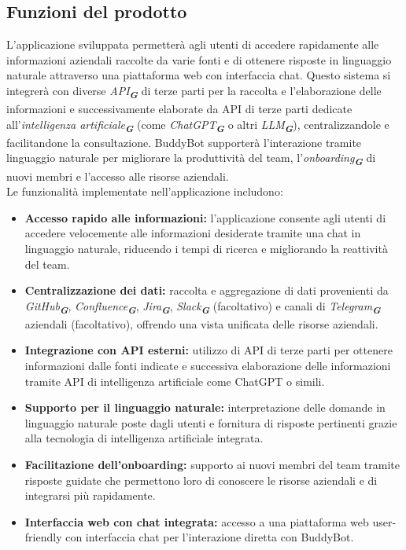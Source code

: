 \subsection{Funzioni del prodotto}
L'applicazione sviluppata permetterà agli utenti di accedere rapidamente alle informazioni aziendali raccolte da varie 
fonti e di ottenere risposte in linguaggio naturale attraverso una piattaforma web con interfaccia chat. Questo sistema 
si integrerà con diverse \emph{API}\textsubscript{\textit{\textbf{G}}}  di terze parti per la raccolta e l'elaborazione delle informazioni e successivamente elaborate
da API  di terze parti dedicate all'\emph{intelligenza artificiale}\textsubscript{\textit{\textbf{G}}}  (come \emph{ChatGPT}\textsubscript{\textit{\textbf{G}}} o altri \emph{LLM}\textsubscript{\textit{\textbf{G}}}), centralizzandole e facilitandone la consultazione. 
BuddyBot supporterà l'interazione tramite linguaggio naturale per migliorare la produttività del team, l'\emph{onboarding}\textsubscript{\textit{\textbf{G}}} di nuovi 
membri e l'accesso alle risorse aziendali.\\
Le funzionalità implementate nell'applicazione includono:
\begin{itemize}
    \item \textbf{Accesso rapido alle informazioni:} l'applicazione consente agli utenti di accedere velocemente alle informazioni desiderate tramite una chat in linguaggio naturale, riducendo i tempi di ricerca e migliorando la reattività del team.
    \item \textbf{Centralizzazione dei dati:} raccolta e aggregazione di dati provenienti da \emph{GitHub}\textsubscript{\textit{\textbf{G}}}, \emph{Confluence}\textsubscript{\textit{\textbf{G}}}, \emph{Jira}\textsubscript{\textit{\textbf{G}}}, \emph{Slack}\textsubscript{\textit{\textbf{G}}} (facoltativo) e canali di \emph{Telegram}\textsubscript{\textit{\textbf{G}}} aziendali (facoltativo), offrendo una vista unificata delle risorse aziendali.
    \item \textbf{Integrazione con API esterni:} utilizzo di API di terze parti per ottenere informazioni dalle fonti indicate e successiva elaborazione delle informazioni tramite API di intelligenza artificiale come ChatGPT o simili.
    \item \textbf{Supporto per il linguaggio naturale:} interpretazione delle domande in linguaggio naturale poste dagli utenti e fornitura di risposte pertinenti grazie alla tecnologia di intelligenza artificiale integrata.
    \item \textbf{Facilitazione dell'onboarding:} supporto ai nuovi membri del team tramite risposte guidate che permettono loro di conoscere le risorse aziendali e di integrarsi più rapidamente.
    \item \textbf{Interfaccia web con chat integrata:} accesso a una piattaforma web user-friendly con interfaccia chat per l'interazione diretta con BuddyBot.
\end{itemize}

